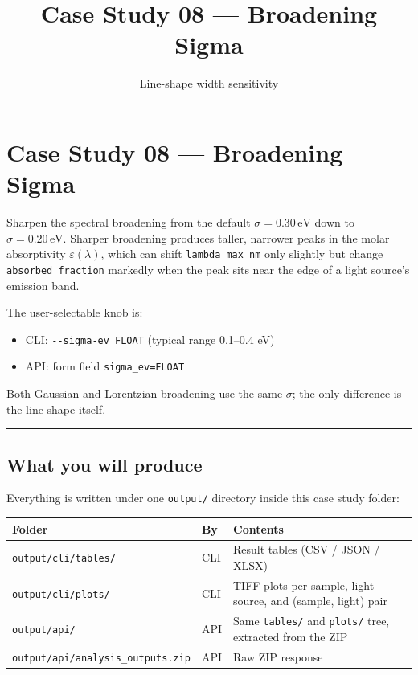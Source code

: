 \documentclass[
  11pt,
]{article}
\title{Case Study 08 — Broadening Sigma}
\subtitle{Line-shape width sensitivity}
\author{}
\date{}
\providecommand{\tightlist}{
  \setlength{\itemsep}{0pt}\setlength{\parskip}{0pt}}
\begin{document}
\maketitle

{
\hypersetup{linkcolor=}
\setcounter{tocdepth}{2}
\tableofcontents
}
\hypertarget{case-study-08--broadening-sigma}{
\section{Case Study 08 --- Broadening
Sigma}\label{case-study-08--broadening-sigma}}

Sharpen the spectral broadening from the default \(\sigma = 0.30\,\text{eV}\)
down to \(\sigma = 0.20\,\text{eV}\). Sharper broadening produces taller,
narrower peaks in the molar absorptivity \(\varepsilon(\lambda)\), which can shift
\texttt{lambda\_max\_nm} only slightly but change
\texttt{absorbed\_fraction} markedly when the peak sits near the edge of
a light source's emission band.

The user-selectable knob is:

\begin{itemize}
\tightlist
\item
  CLI: \texttt{-\/-sigma-ev\ FLOAT} (typical range 0.1--0.4 eV)
\item
  API: form field \texttt{sigma\_ev=FLOAT}
\end{itemize}

Both Gaussian and Lorentzian broadening use the same \(\sigma\); the only
difference is the line shape itself.

\begin{center}\rule{0.5\linewidth}{0.5pt}\end{center}

\hypertarget{what-you-will-produce}{
\subsection{What you will produce}\label{what-you-will-produce}}

Everything is written under one \texttt{output/} directory inside this
case study folder:

\begin{longtable}[]{@{}lll@{}}
\toprule
Folder & By & Contents \\
\midrule
\endhead
\texttt{output/cli/tables/} & CLI & Result tables (CSV / JSON / XLSX) \\
\texttt{output/cli/plots/} & CLI & TIFF plots per sample, light source,
and (sample, light) pair \\
\texttt{output/api/} & API & Same \texttt{tables/} and \texttt{plots/}
tree, extracted from the ZIP \\
\texttt{output/api/analysis\_outputs.zip} & API & Raw ZIP response \\
\bottomrule
\end{longtable}
\end{document}

